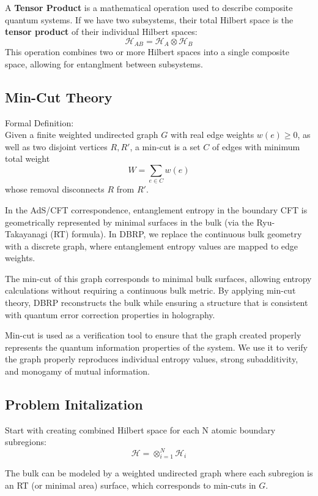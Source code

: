 \documentclass[12pt]{article}
\begin{document}
    \vspace{0.3cm}

    \indent A \textbf{Tensor Product} is a mathematical operation used to describe composite quantum systems. If we have two subsystems, their total Hilbert space is the \textbf{tensor product} of their individual Hilbert spaces: 
    \[
        \mathcal{H}_{AB} = \mathcal{H}_{A} \otimes \mathcal{H}_B
    \]
    This operation combines two or more Hilbert spaces into a single composite space, allowing for entanglment between subsystems. 

\subsection{Min-Cut Theory}
Formal Definition:
\\
Given a finite weighted undirected graph \( G \) with real edge weights \( w(e) \geq 0 \), as well as two disjoint vertices \( R, R' \), a min-cut is a set \( C \) of edges with minimum total weight
    \[
    W = \sum_{e \in C} w(e)
    \]
whose removal disconnects \( R \) from \( R' \).

In the AdS/CFT correspondence, entanglement entropy in the boundary CFT is geometrically represented by minimal surfaces in the bulk (via the Ryu-Takayanagi (RT) formula). In DBRP, we replace the continuous bulk geometry with a discrete graph, where entanglement entropy values are mapped to edge weights.

The min-cut of this graph corresponds to minimal bulk surfaces, allowing entropy calculations without requiring a continuous bulk metric. By applying min-cut theory, DBRP reconstructs the bulk while ensuring a structure that is consistent with quantum error correction properties in holography.

Min-cut is used as a verification tool to ensure that the graph created properly represents the quantum information properties of the system.
We use it to verify the graph properly reproduces individual entropy values, strong subadditivity, and monogamy of mutual information.

\subsection{Problem Initalization}
Start with creating combined Hilbert space for each N atomic boundary subregions:
\[
\mathcal{H} = \otimes^{N}_{i=1}\mathcal{H}_{i}
\]

The bulk can be modeled by a weighted undirected graph where each subregion is an RT (or minimal area) surface, which corresponds to min-cuts in \( G \).
\end{document}
